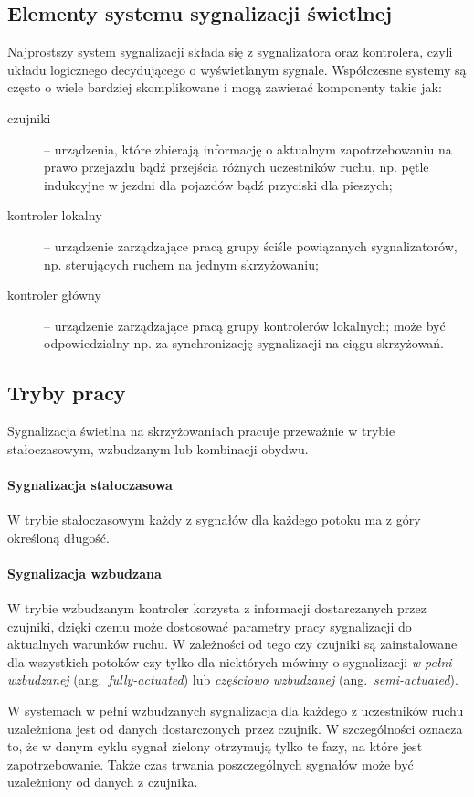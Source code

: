 \documentclass{pracamgr}
\newcommand{\ang}[1]{(ang.~\emph{#1})}
\theoremstyle{plain}
\begin{document}
\subsection{Elementy systemu sygnalizacji świetlnej}
\label{ss:elementy} Najprostszy system sygnalizacji składa się z
sygnalizatora oraz kontrolera, czyli układu logicznego decydującego o
wyświetlanym sygnale. Współczesne systemy są często o wiele bardziej
skomplikowane i mogą zawierać komponenty takie jak:
\begin{description}
  \item[czujniki] -- urządzenia, które zbierają informację o aktualnym
zapotrzebowaniu na prawo przejazdu bądź przejścia różnych uczestników
ruchu, np. pętle indukcyjne w jezdni dla pojazdów bądź przyciski dla
pieszych;
  \item[kontroler lokalny] -- urządzenie zarządzające pracą grupy
ściśle powiązanych sygnalizatorów, np. sterujących ruchem na jednym
skrzyżowaniu;
  \item[kontroler główny] -- urządzenie zarządzające pracą grupy
kontrolerów lokalnych; może być odpowiedzialny np. za synchronizację
sygnalizacji na ciągu skrzyżowań.
\end{description}

\subsection{Tryby pracy}
\label{ss:tryby} Sygnalizacja świetlna na skrzyżowaniach pracuje
przeważnie w trybie stałoczasowym, wzbudzanym lub kombinacji obydwu.

\paragraph{Sygnalizacja stałoczasowa} W trybie stałoczasowym każdy z
sygnałów dla każdego potoku ma z góry określoną długość.

\paragraph{Sygnalizacja wzbudzana} W trybie wzbudzanym kontroler
korzysta z informacji dostarczanych przez czujniki, dzięki czemu może
dostosować parametry pracy sygnalizacji do aktualnych warunków
ruchu. W zależności od tego czy czujniki są zainstalowane dla
wszystkich potoków czy tylko dla niektórych mówimy o sygnalizacji
\emph{w pełni wzbudzanej} \ang{fully-actuated} lub \emph{częściowo
wzbudzanej} \ang{semi-actuated}.

W systemach w pełni wzbudzanych sygnalizacja dla każdego z uczestników
ruchu uzależniona jest od danych dostarczonych przez czujnik. W
szczególności oznacza to, że w danym cyklu sygnał zielony otrzymują
tylko te fazy, na które jest zapotrzebowanie. Także czas trwania
poszczególnych sygnałów może być uzależniony od danych z czujnika.
\end{document}
